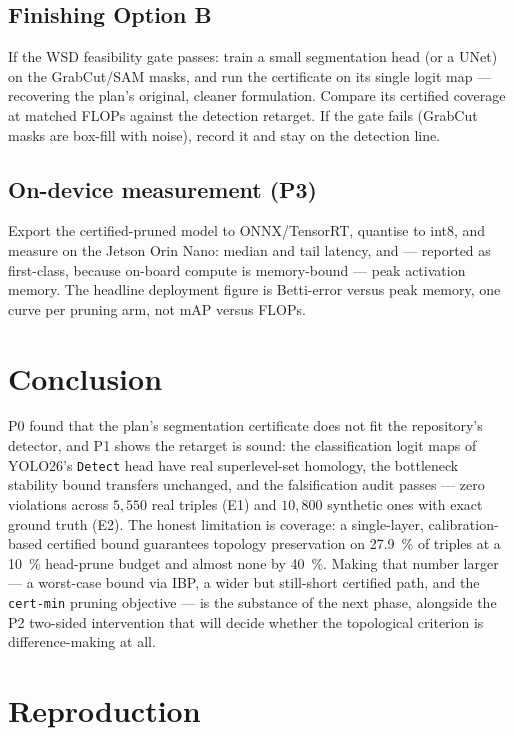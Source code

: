 \documentclass[11pt]{article}
\newcommand{\code}[1]{\texttt{\small #1}}
\theoremstyle{definition}
\theoremstyle{plain}
\begin{document}
\subsection{Finishing Option B}

If the WSD feasibility gate passes: train a small segmentation head (or a UNet)
on the GrabCut/SAM masks, and run the certificate on its single logit map ---
recovering the plan's original, cleaner formulation. Compare its certified
coverage at matched FLOPs against the detection retarget. If the gate fails
(GrabCut masks are box-fill with noise), record it and stay on the detection
line.

\subsection{On-device measurement (P3)}

Export the certified-pruned model to ONNX/TensorRT, quantise to int8, and measure
on the Jetson Orin Nano: median and tail latency, and --- reported as
first-class, because on-board compute is memory-bound --- peak activation memory.
The headline deployment figure is Betti-error versus peak memory, one curve per
pruning arm, not mAP versus FLOPs.

\section{Conclusion}

P0 found that the plan's segmentation certificate does not fit the repository's
detector, and P1 shows the retarget is sound: the classification logit maps of
YOLO26's \code{Detect} head have real superlevel-set homology, the bottleneck
stability bound transfers unchanged, and the falsification audit passes --- zero
violations across $5{,}550$ real triples (E1) and $10{,}800$ synthetic ones with
exact ground truth (E2). The honest limitation is coverage: a single-layer,
calibration-based certified bound guarantees topology preservation on
\SI{27.9}{\percent} of triples at a \SI{10}{\percent} head-prune budget and
almost none by \SI{40}{\percent}. Making that number larger --- a worst-case
bound via IBP, a wider but still-short certified path, and the \code{cert-min}
pruning objective --- is the substance of the next phase, alongside the P2
two-sided intervention that will decide whether the topological criterion is
difference-making at all.

\appendix
\section{Reproduction}
\end{document}
